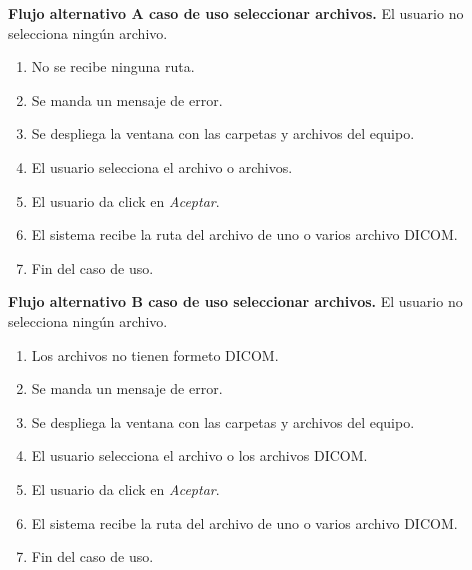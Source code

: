 \documentclass[12pt]{report}
\begin{document}
\textbf{Flujo alternativo A caso de uso seleccionar archivos. }
El usuario no selecciona ningún archivo.
\begin{enumerate}[{A}1{.}]
\item No se recibe ninguna ruta.
\item Se manda un mensaje de error.
\item Se despliega la ventana con las carpetas y archivos del equipo.
\item El usuario selecciona el archivo o archivos.
\item El usuario da click en \textit{Aceptar}.
\item El sistema recibe la ruta del archivo de uno o varios archivo DICOM.
\item Fin del caso de uso.
\end{enumerate}

\textbf{Flujo alternativo B caso de uso seleccionar archivos. }
El usuario no selecciona ningún archivo.
\begin{enumerate}[{A}1{.}]
\item Los archivos no tienen formeto DICOM.
\item Se manda un mensaje de error.
\item Se despliega la ventana con las carpetas y archivos del equipo.
\item El usuario selecciona el archivo o los archivos DICOM.
\item El usuario da click en \textit{Aceptar}.
\item El sistema recibe la ruta del archivo de uno o varios archivo DICOM.
\item Fin del caso de uso.
\end{enumerate}
\end{document}
